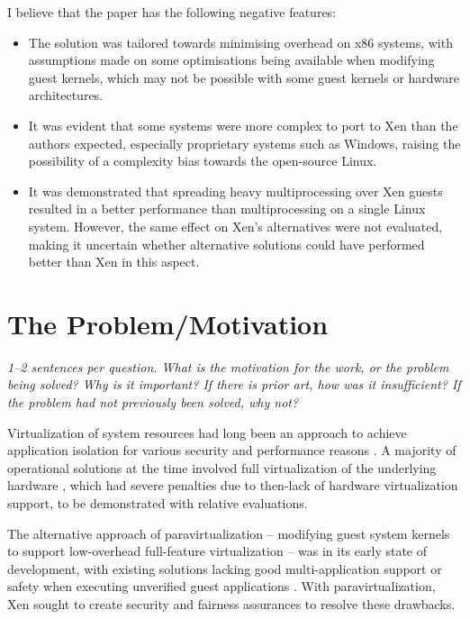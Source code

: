 \documentclass[11pt]{article}
\begin{document}
I believe that the paper has the following negative features:
\begin{itemize}
	\item The solution was tailored towards minimising overhead on x86 systems, with assumptions made on some optimisations being available when modifying guest kernels, which may not be possible with some guest kernels or hardware architectures.
	\item It was evident that some systems were more complex to port to Xen than the authors expected, especially proprietary systems such as Windows, raising the possibility of a complexity bias towards the open-source Linux.
	\item It was demonstrated that spreading heavy multiprocessing over Xen guests resulted in a better performance than multiprocessing on a single Linux system. However, the same effect on Xen's alternatives were not evaluated, making it uncertain whether alternative solutions could have performed better than Xen in this aspect.
\end{itemize}

\section*{The Problem/Motivation}
\textsl{1--2 sentences per question. What is the motivation for the work, or the problem being solved? Why is it important? If there is prior art, how was it insufficient? If the problem had not previously been solved, why not?}

Virtualization of system resources had long been an approach to achieve application isolation for various security and performance reasons \cite{xing2012virtualization}. A majority of operational solutions at the time involved full virtualization of the underlying hardware \cite{goud2010method} \cite{devine2002virtualization}, which had severe penalties due to then-lack of hardware virtualization support, to be demonstrated with relative evaluations. 

The alternative approach of paravirtualization -- modifying guest system kernels to support low-overhead full-feature virtualization -- was in its early state of development, with existing solutions lacking good multi-application support \cite{whitaker2002scale} or safety when executing unverified guest applications \cite{peterson2003blueprint}. With paravirtualization, Xen sought to create security and fairness assurances to resolve these drawbacks.
\end{document}
